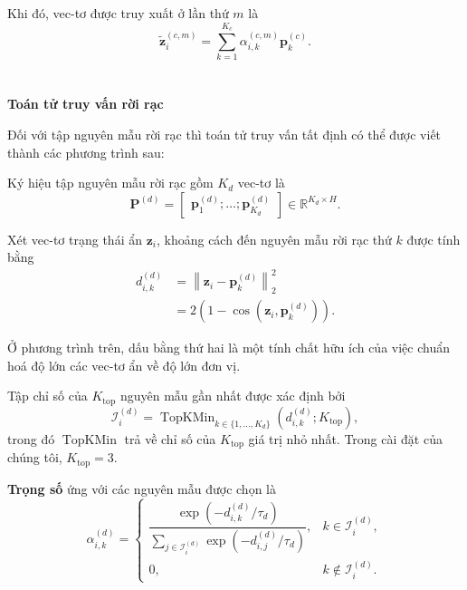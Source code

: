 Khi đó, vec-tơ được truy xuất ở lần thứ \(m\) là
\begin{equation}
\widetilde{\mathbf{z}}^{(c,m)}_{i}
=
\sum_{k=1}^{K_c}
\alpha^{(c,m)}_{i,k}
\mathbf{p}^{(c)}_k.
\end{equation} \\ \\

\textbf{Toán tử truy vấn rời rạc}

Đối với tập nguyên mẫu rời rạc thì toán tử truy vấn tất định có thể được viết thành các phương trình sau:

Ký hiệu tập nguyên mẫu rời rạc gồm \(K_d\) vec-tơ là
\begin{equation}
\mathbf{P}^{(d)}
=
\begin{bmatrix}
\mathbf{p}^{(d)}_1;
\ldots;
\mathbf{p}^{(d)}_{K_d}
\end{bmatrix}
\in \mathbb{R}^{K_d\times H}.
\end{equation}

Xét vec-tơ trạng thái ẩn \(\mathbf{z}_{i}\), khoảng cách đến nguyên mẫu rời rạc thứ \(k\) được tính bằng
\begin{equation}
\begin{aligned}
d^{(d)}_{i,k}
&=
\left\|
\mathbf{z}_{i}
-
\mathbf{p}^{(d)}_k
\right\|_2^2
\\
&=
2\left(
1-
\operatorname{cos}
\left(
\mathbf{z}_{i},
\mathbf{p}^{(d)}_k
\right)
\right).
\end{aligned}
\end{equation}

Ở phương trình trên, dấu bằng thứ hai là một tính chất hữu ích của việc chuẩn hoá độ lớn các vec-tơ ẩn về độ lớn đơn vị.

Tập chỉ số của \(K_{\mathrm{top}}\) nguyên mẫu gần nhất được xác định bởi
\begin{equation}
\mathcal{I}^{(d)}_{i}
=
\operatorname{TopKMin}_{k\in\{1,\ldots,K_d\}}
\left(
d^{(d)}_{i,k};
K_{\mathrm{top}}
\right),
\end{equation}
trong đó \(\operatorname{TopKMin}\) trả về chỉ số của \(K_{\mathrm{top}}\) giá trị nhỏ nhất. Trong cài đặt của chúng tôi, \(K_{\mathrm{top}}=3\).

\textbf{Trọng số} ứng với các nguyên mẫu được chọn là
\begin{equation}
\alpha^{(d)}_{i,k}
=
\begin{cases}
\dfrac{
\exp\left(-d^{(d)}_{i,k}/\tau_d\right)
}{
\displaystyle
\sum_{j\in\mathcal{I}^{(d)}_{i}}
\exp\left(-d^{(d)}_{i,j}/\tau_d\right)
},
&
k\in\mathcal{I}^{(d)}_{i},
\\[12pt]
0,
&
k\notin\mathcal{I}^{(d)}_{i}.
\end{cases}
\end{equation}

